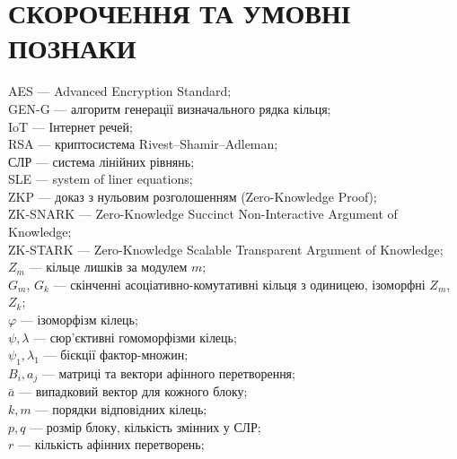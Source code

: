 \chapter*{СКОРОЧЕННЯ ТА УМОВНІ ПОЗНАКИ}
{}

\noindent
AES --- Advanced Encryption Standard; \\
GEN-G --- алгоритм генерації визначального рядка кільця; \\
IoT --- Інтернет речей; \\
RSA --- криптосистема Rivest–Shamir–Adleman; \\
СЛР --- система лінійних рівнянь; \\
SLE --- system of liner equations; \\
ZKP --- доказ з нульовим розголошенням (Zero-Knowledge Proof); \\
ZK-SNARK --- Zero-Knowledge Succinct Non-Interactive Argument of Knowledge; \\
ZK-STARK --- Zero-Knowledge Scalable Transparent Argument of Knowledge; \\
$Z_m$ --- кільце лишків за модулем $m$; \\
$G_m$, $G_k$ --- скінченні асоціативно-комутативні кільця з одиницею, ізоморфні $Z_m$, $Z_k$; \\
$\varphi$ --- ізоморфізм кілець; \\
$\psi, \lambda$ --- сюр'єктивні гомоморфізми кілець; \\
$\psi_1, \lambda_1$ --- бієкції фактор-множин; \\
$B_i, a_j$ --- матриці та вектори афінного перетворення; \\
$\bar{a}$ --- випадковий вектор для кожного блоку; \\
$k, m$ --- порядки відповідних кілець; \\
$p, q$ --- розмір блоку, кількість змінних у СЛР; \\
$r$ --- кількість афінних перетворень; \\
